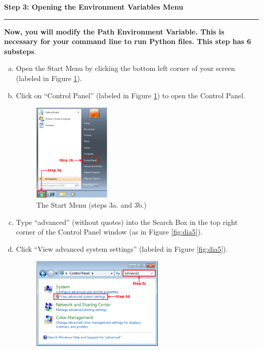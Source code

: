 \documentclass[11pt,english]{article}
\newcommand{\myhrule}{\vspace{0.3cm}\hrule\vspace{0.3cm}}
\begin{document}
\newpage
{\Large {\bf Step 3: Opening the Environment Variables Menu}}
\myhrule
{\bf Now, you will modify the Path Environment Variable. This is necessary for
your command line to run Python files. This step has 6 substeps}.
\begin{enumerate}[a.]
\item Open the Start Menu by clicking the bottom left corner of your screen
(labeled in Figure \ref{fig:dia4}).
\item Click on ``Control Panel'' (labeled in Figure \ref{fig:dia4}) to open
the Control Panel.
\begin{figure}[h]
\begin{center}
\includegraphics[width=0.35\textwidth]{dia4}
\end{center}
\vspace{-0.5cm}
\caption{The Start Menu (steps 3a. and 3b.)}
\label{fig:dia4}
\end{figure}
\item Type ``advanced'' (without quotes) into the Search Box in the top right
corner of the Control Panel window (as in Figure \ref{fig:dia5}).
\item Click ``View advanced system settings'' (labeled in Figure
\ref{fig:dia5}).
\begin{figure}[h]
\begin{center}
\includegraphics[width=0.6\textwidth]{dia5}
\end{center}

\end{figure}
\end{enumerate}
\end{document}
